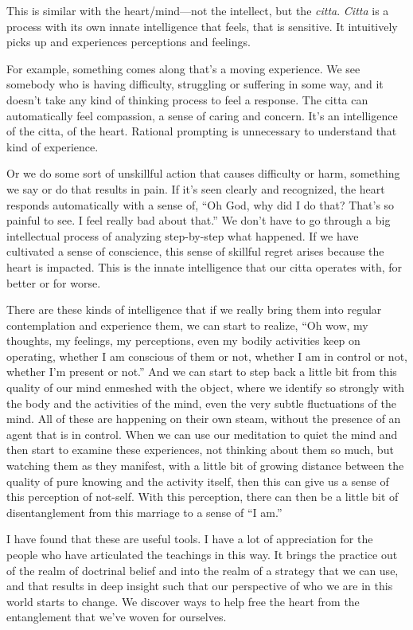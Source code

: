 This is similar with the heart/mind---not the intellect, but the \emph{citta}. \emph{Citta} is a process with its own innate intelligence that feels, that is sensitive. It intuitively picks up and experiences perceptions and feelings.

For example, something comes along that's a moving experience. We see somebody who is having difficulty, struggling or suffering in some way, and it doesn't take any kind of thinking process to feel a response. The citta can automatically feel compassion, a sense of caring and concern. It's an intelligence of the citta, of the heart. Rational prompting is unnecessary to understand that kind of experience.

Or we do some sort of unskillful action that causes difficulty or harm, something we say or do that results in pain. If it's seen clearly and recognized, the heart responds automatically with a sense of, ``Oh God, why did I do that? That's so painful to see. I feel really bad about that.'' We don't have to go through a big intellectual process of analyzing step-by-step what happened. If we have cultivated a sense of conscience, this sense of skillful regret arises because the heart is impacted. This is the innate intelligence that our citta operates with, for better or for worse.

There are these kinds of intelligence that if we really bring them into regular contemplation and experience them, we can start to realize, ``Oh wow, my thoughts, my feelings, my perceptions, even my bodily activities keep on operating, whether I am conscious of them or not, whether I am in control or not, whether I'm present or not.'' And we can start to step back a little bit from this quality of our mind enmeshed with the object, where we identify so strongly with the body and the activities of the mind, even the very subtle fluctuations of the mind. All of these are happening on their own steam, without the presence of an agent that is in control. When we can use our meditation to quiet the mind and then start to examine these experiences, not thinking about them so much, but watching them as they manifest, with a little bit of growing distance between the quality of pure knowing and the activity itself, then this can give us a sense of this perception of not-self. With this perception, there can then be a little bit of disentanglement from this marriage to a sense of ``I am.''

I have found that these are useful tools. I have a lot of appreciation for the people who have articulated the teachings in this way. It brings the practice out of the realm of doctrinal belief and into the realm of a strategy that we can use, and that results in deep insight such that our perspective of who we are in this world starts to change. We discover ways to help free the heart from the entanglement that we've woven for ourselves.

